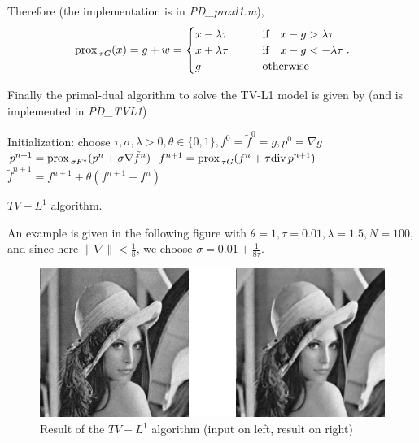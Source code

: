 \documentclass[letter,10pt]{article}
\def\Div{\textup{div\,}}
\def\prox{\textup{prox\,}}
\begin{document}
Therefore (the implementation is in \textit{PD\_proxl1.m}),
$$\prox_{\tau G}(x)=g+w=
\begin{cases}
x-\lambda\tau\qquad&\text{if}\quad x-g>\lambda\tau\\
x+\lambda\tau &\text{if}\quad x-g<-\lambda\tau\\
g&\text{otherwise}
\end{cases}.$$

Finally the primal-dual algorithm to solve the TV-L1 model is given by (and is implemented in \textit{PD\_TVL1})
\begin{algorithm}[H]
\begin{algorithmic}
\STATE Initialization: choose $\tau,\sigma,\lambda>0,\theta\in\{0,1\},f^0=\tilde{f}^0=g,p^0=\nabla g$
\REPEAT 
\STATE $p^{n+1}=\prox_{\sigma F^*}(p^n+\sigma \nabla\tilde{f}^n)$
\STATE $f^{n+1}=\prox_{\tau G}(f^n+\tau \Div p^{n+1})$
\STATE $\tilde{f}^{n+1}=f^{n+1}+\theta(f^{n+1}-f^n)$
\end{algorithmic}
\caption{$TV-L^1$ algorithm.}
\end{algorithm}
An example is given in the following figure with $\theta=1,\tau=0.01,\lambda=1.5,N=100$, and since here $\|\nabla\|<\frac{1}{8}$, we choose $\sigma=0.01+\frac{1}{8\tau}$.
\begin{figure}[H]
\centering\includegraphics[width=\textwidth]{tvl1.png}
\caption{Result of the $TV-L^1$ algorithm (input on left, result on right)}
\end{figure}
\end{document}
